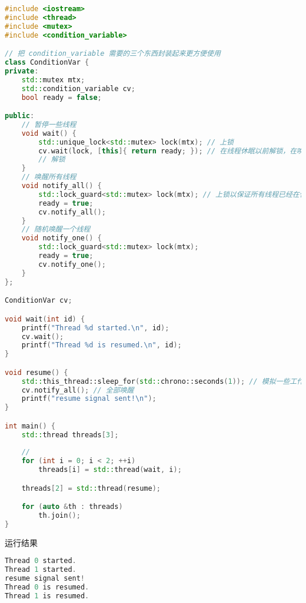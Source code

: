 \begin{lstlisting}[language=cpp]
#include <iostream>
#include <thread>
#include <mutex>
#include <condition_variable>

// 把 condition_variable 需要的三个东西封装起来更方便使用
class ConditionVar {
private:
    std::mutex mtx;
    std::condition_variable cv;
    bool ready = false;

public:
    // 暂停一些线程
    void wait() {
        std::unique_lock<std::mutex> lock(mtx); // 上锁
        cv.wait(lock, [this]{ return ready; }); // 在线程休眠以前解锁，在唤醒时枪锁
        // 解锁
    }
    // 唤醒所有线程
    void notify_all() {
        std::lock_guard<std::mutex> lock(mtx); // 上锁以保证所有线程已经在休眠
        ready = true;
        cv.notify_all();
    }
    // 随机唤醒一个线程
    void notify_one() {
        std::lock_guard<std::mutex> lock(mtx);
        ready = true;
        cv.notify_one();
    }
};

ConditionVar cv;

void wait(int id) {
	printf("Thread %d started.\n", id);
    cv.wait();
	printf("Thread %d is resumed.\n", id);
}

void resume() {
    std::this_thread::sleep_for(std::chrono::seconds(1)); // 模拟一些工作
    cv.notify_all(); // 全部唤醒
    printf("resume signal sent!\n");
}

int main() {
    std::thread threads[3];
    
    // 
    for (int i = 0; i < 2; ++i)
        threads[i] = std::thread(wait, i);

    threads[2] = std::thread(resume);

    for (auto &th : threads)
        th.join();
}
\end{lstlisting}
运行结果
\begin{lstlisting}[language=cpp]
Thread 0 started.
Thread 1 started.
resume signal sent!
Thread 0 is resumed.
Thread 1 is resumed.
\end{lstlisting}
